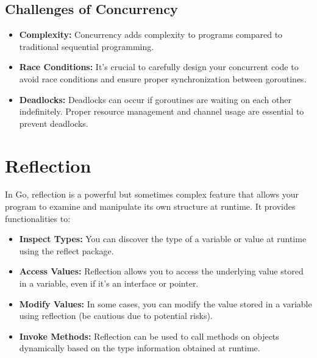 \documentclass[letterpaper,12pt]{article}
\begin{document}
\subsection{Challenges of Concurrency}
\begin{itemize}
  \item \textbf{Complexity:} Concurrency adds complexity to programs compared to traditional sequential programming.
  \item \textbf{Race Conditions:} It's crucial to carefully design your concurrent code to avoid race conditions and ensure proper synchronization between goroutines.
  \item \textbf{Deadlocks:} Deadlocks can occur if goroutines are waiting on each other indefinitely. Proper resource management and channel usage are essential to prevent deadlocks.
\end{itemize}

\section{Reflection}
In Go, reflection is a powerful but sometimes complex feature that allows your program to examine and manipulate its own structure at runtime. It provides functionalities to:
\begin{itemize}
  \item \textbf{Inspect Types:} You can discover the type of a variable or value at runtime using the reflect package.
  \item \textbf{Access Values:} Reflection allows you to access the underlying value stored in a variable, even if it's an interface or pointer.
  \item \textbf{Modify Values:} In some cases, you can modify the value stored in a variable using reflection (be cautious due to potential risks).
  \item \textbf{Invoke Methods:} Reflection can be used to call methods on objects dynamically based on the type information obtained at runtime.
\end{itemize}
\noindent
\end{document}
